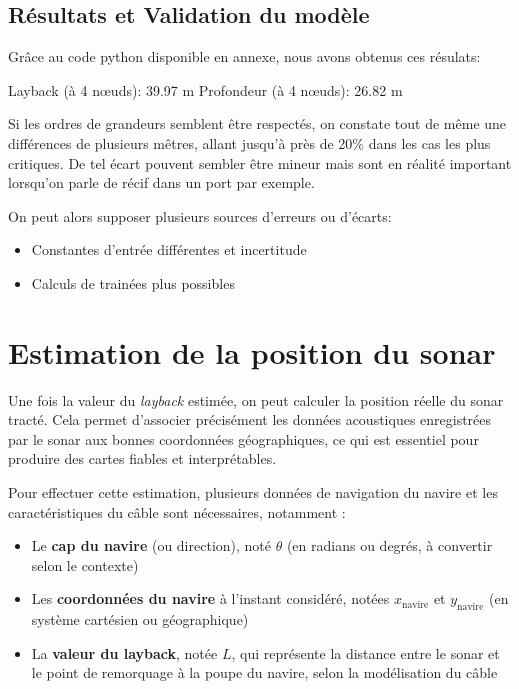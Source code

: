\documentclass[12pt,a4paper]{report}
\begin{document}
\subsection{Résultats et Validation du modèle}


Grâce au code python disponible en annexe, nous avons obtenus ces résulats:

Layback (à 4 nœuds): 39.97 m
Profondeur (à 4 nœuds): 26.82 m

Si les ordres de grandeurs semblent être respectés, on constate tout de même une différences de plusieurs mêtres,
allant jusqu'à près de 20\% dans les cas les plus critiques.
De tel écart pouvent sembler être mineur mais sont en réalité important lorsqu'on parle de récif dans un port par exemple.

On peut alors supposer plusieurs sources d'erreurs ou d'écarts:
\begin{itemize}
  \item Constantes d'entrée différentes et incertitude
  \item Calculs de trainées plus possibles
\end{itemize}


\section{Estimation de la position du sonar}
Une fois la valeur du \textit{layback} estimée, on peut calculer la position réelle du sonar tracté. Cela permet d’associer précisément les données acoustiques enregistrées par le sonar aux bonnes coordonnées géographiques, ce qui est essentiel pour produire des cartes fiables et interprétables.

Pour effectuer cette estimation, plusieurs données de navigation du navire et les caractéristiques du câble sont nécessaires, notamment :

\begin{itemize}
  \item Le \textbf{cap du navire} (ou direction), noté $\theta$ (en radians ou degrés, à convertir selon le contexte)
  \item Les \textbf{coordonnées du navire} à l’instant considéré, notées $x_{\text{navire}}$ et $y_{\text{navire}}$ (en système cartésien ou géographique)
  \item La \textbf{valeur du layback}, notée $L$, qui représente la distance entre le sonar et le point de remorquage à la poupe du navire, selon la modélisation du câble
\end{itemize}
\end{document}
